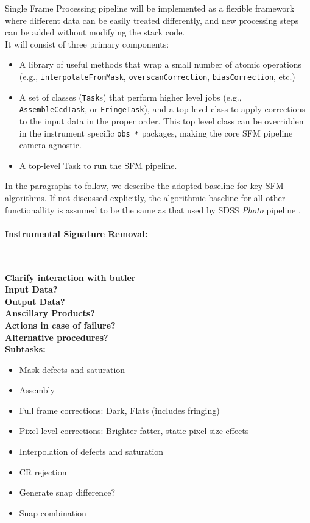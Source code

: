 Single Frame Processing pipeline will be implemented as a flexible framework where different data can be easily treated differently, and new processing steps can be added without modifying the stack code.
\\

It will consist of three primary components:
%
\begin{itemize}
    \item A library of useful methods that wrap a small number of atomic operations (e.g., {\tt interpolateFromMask}, {\tt overscanCorrection}, {\tt biasCorrection}, etc.) %
    \item A set of classes ({\tt Task}s) that perform higher level jobs
    (e.g., {\tt AssembleCcdTask}, or {\tt FringeTask}), and a top level class to apply corrections to the input data in the proper order. This top level class can be overridden in the instrument specific {\tt obs\_*} packages, making the core SFM pipeline camera agnostic.
    \item A top-level Task to run the SFM pipeline.
\end{itemize}

In the paragraphs to follow, we describe the adopted baseline for key SFM algorithms. If not discussed explicitly, the algorithmic baseline for all other functionallity is assumed to be the same as that used by SDSS \emph{Photo} pipeline \cite{LuptonPhoto}.

\paragraph{Instrumental Signature Removal:}~

\noindent
{\bf Clarify interaction with butler}\\

\noindent
{\bf Input Data?}\\
{\bf Output Data?}\\
{\bf Anscillary Products?}\\
{\bf Actions in case of failure?}\\
{\bf Alternative procedures?}\\

\noindent
{\bf Subtasks:}
\begin{itemize}
\item Mask defects and saturation
\item Assembly
\item Full frame corrections: Dark, Flats (includes fringing)
\item Pixel level corrections: Brighter fatter, static pixel size effects
\item Interpolation of defects and saturation
\item CR rejection
\item Generate snap difference?
\item Snap combination
\end{itemize}


